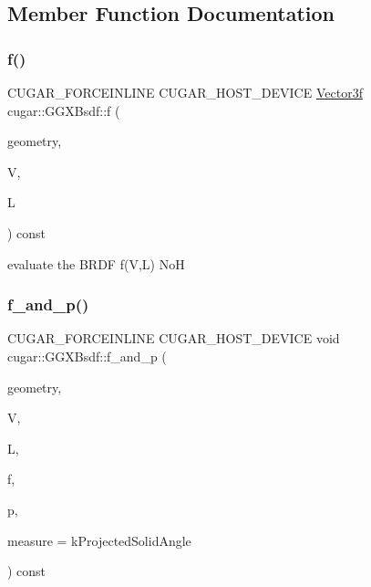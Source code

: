 \subsection{Member Function Documentation}
\mbox{\label{structcugar_1_1_g_g_x_bsdf_ade42e4704bbe10ead6428c9ad0bc4bca}} 
\subsubsection{\texorpdfstring{f()}{f()}}
{\footnotesize\ttfamily C\+U\+G\+A\+R\+\_\+\+F\+O\+R\+C\+E\+I\+N\+L\+I\+NE C\+U\+G\+A\+R\+\_\+\+H\+O\+S\+T\+\_\+\+D\+E\+V\+I\+CE \hyperlink{structcugar_1_1_vector}{Vector3f} cugar\+::\+G\+G\+X\+Bsdf\+::f (\begin{DoxyParamCaption}\item[{const \hyperlink{structcugar_1_1_differential_geometry}{Differential\+Geometry} \&}]{geometry,  }\item[{const \hyperlink{structcugar_1_1_vector}{Vector3f}}]{V,  }\item[{const \hyperlink{structcugar_1_1_vector}{Vector3f}}]{L }\end{DoxyParamCaption}) const\hspace{0.3cm}{\ttfamily [inline]}}

evaluate the B\+R\+DF f(\+V,\+L) NoH \mbox{\label{structcugar_1_1_g_g_x_bsdf_a19e0c339e47c732475fdff4d9830034b}} 
\subsubsection{\texorpdfstring{f\+\_\+and\+\_\+p()}{f\_and\_p()}}
{\footnotesize\ttfamily C\+U\+G\+A\+R\+\_\+\+F\+O\+R\+C\+E\+I\+N\+L\+I\+NE C\+U\+G\+A\+R\+\_\+\+H\+O\+S\+T\+\_\+\+D\+E\+V\+I\+CE void cugar\+::\+G\+G\+X\+Bsdf\+::f\+\_\+and\+\_\+p (\begin{DoxyParamCaption}\item[{const \hyperlink{structcugar_1_1_differential_geometry}{Differential\+Geometry} \&}]{geometry,  }\item[{const \hyperlink{structcugar_1_1_vector}{Vector3f}}]{V,  }\item[{const \hyperlink{structcugar_1_1_vector}{Vector3f}}]{L,  }\item[{\hyperlink{structcugar_1_1_vector}{Vector3f} \&}]{f,  }\item[{float \&}]{p,  }\item[{const Spherical\+Measure}]{measure = {\ttfamily kProjectedSolidAngle} }\end{DoxyParamCaption}) const\hspace{0.3cm}{\ttfamily [inline]}}

